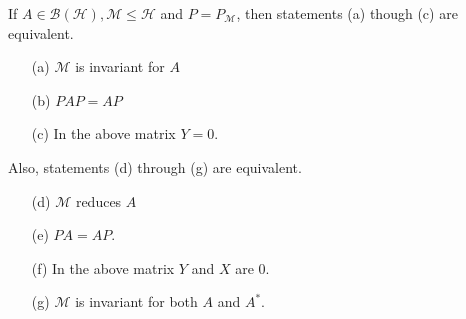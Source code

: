 \begin{prop}
    If $A \in \mathscr{B}(\mathscr{H}), \mathscr{M} \leq \mathscr{H}$ and $P = P_{\mathscr{M}}$, then statements (a) though (c) are equivalent.
    \begin{enumerate}
        \item[(a)] $\mathscr{M}$ is invariant for $A$
        \item[(b)] $PAP = AP$
        \item[(c)] In the above matrix $Y = 0$.
    \end{enumerate}
    Also, statements (d) through (g) are equivalent.
    \begin{enumerate}
        \item[(d)] $\mathscr{M}$ reduces $A$
        \item[(e)] $PA = AP$.
        \item[(f)] In the above matrix $Y$ and $X$ are $0$.
        \item[(g)] $\mathscr{M}$ is invariant for both $A$ and $A^*$.
    \end{enumerate}
\end{prop}

